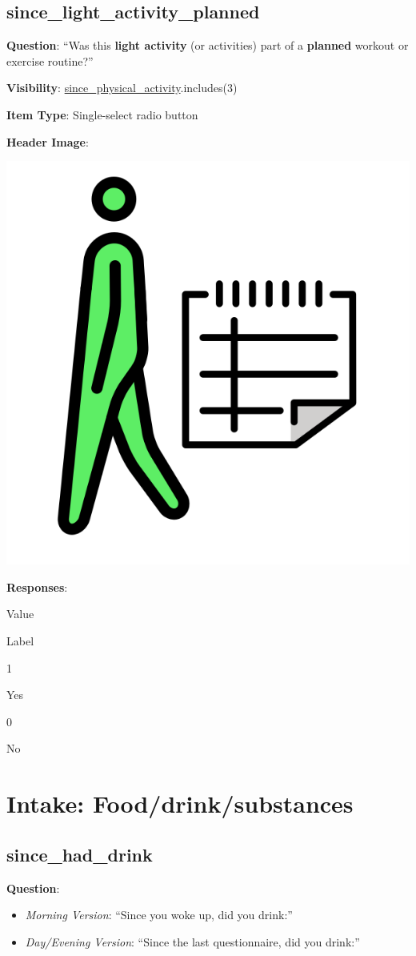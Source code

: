 \documentclass[]{book}
\providecommand{\tightlist}{%
  \setlength{\itemsep}{0pt}\setlength{\parskip}{0pt}}
\begin{document}
\hypertarget{since_light_activity_planned}{%
\section{since\_light\_activity\_planned}\label{since_light_activity_planned}}

\textbf{Question}: ``Was this \textbf{light activity} (or activities) part of a \textbf{planned} workout or exercise routine?''

\textbf{Visibility}: \protect\hyperlink{since_physical_activity}{since\_physical\_activity}.includes(3)

\textbf{Item Type}: Single-select radio button

\textbf{Header Image}:

\begin{flushleft}\includegraphics[width=0.33\linewidth]{downloadFigs4latex_NIMH_Applet_Codebook/since_light_activity_planned_headerImg} \end{flushleft}

\textbf{Responses}:

Value

Label

1

Yes

0

No

\hypertarget{intake_section}{%
\chapter{Intake: Food/drink/substances}\label{intake_section}}

\hypertarget{since_had_drink}{%
\section{since\_had\_drink}\label{since_had_drink}}

\textbf{Question}:

\begin{itemize}
\tightlist
\item
  \emph{Morning Version}: ``Since you woke up, did you drink:''
\item
  \emph{Day/Evening Version}: ``Since the last questionnaire, did you drink:''
\end{itemize}
\end{document}
